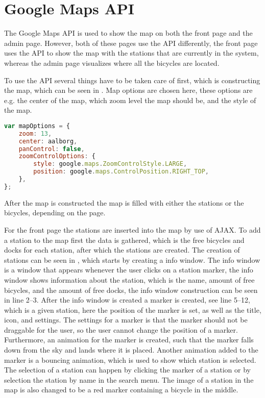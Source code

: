 \section{Google Maps API}
The Google Maps API \citep{misc:googlemapsapi} is used to show the map on both the front page and the admin page.
However, both of these pages use the API differently, the front page uses the API to show the map with the stations that are currently in the system, whereas the admin page visualizes where all the bicycles are located.

To use the API several things have to be taken care of first, which is constructing the map, which can be seen in .
Map options are chosen here, these options are e.g. the center of the map, which zoom level the map should be, and the style of the map.

\begin{minipage}{\textwidth}
\begin{lstlisting}[caption={Construction of the map}, label={lst:mapoptions}, language=Javascript]
var mapOptions = {
	zoom: 13,
	center: aalborg,
	panControl: false,
    zoomControlOptions: {
		style: google.maps.ZoomControlStyle.LARGE,
		position: google.maps.ControlPosition.RIGHT_TOP,
	},
};
\end{lstlisting}
\end{minipage}

After the map is constructed the map is filled with either the stations or the bicycles, depending on the page.

For the front page the stations are inserted into the map by use of AJAX.
To add a station to the map first the data is gathered, which is the free bicycles and docks for each station, after which the stations are created.
The creation of stations can be seen in , which starts by creating a info window.
The info window is a window that appears whenever the user clicks on a station marker, the info window shows information about the station, which is the name, amount of free bicycles, and the amount of free docks, the info window construction can be seen in line 2--3.
After the info window is created a marker is created, see line 5--12, which is a given station, here the position of the marker is set, as well as the title, icon, and settings.
The settings for a marker is that the marker should not be draggable for the user, so the user cannot change the position of a marker.
Furthermore, an animation for the marker is created, such that the marker falls down from the sky and lands where it is placed.
Another animation added to the marker is a bouncing animation, which is used to show which station is selected. The selection of a station can happen by clicking the marker of a station or by selection the station by name in the search menu.
The image of a station in the map is also changed to be a red marker containing a bicycle in the middle.


